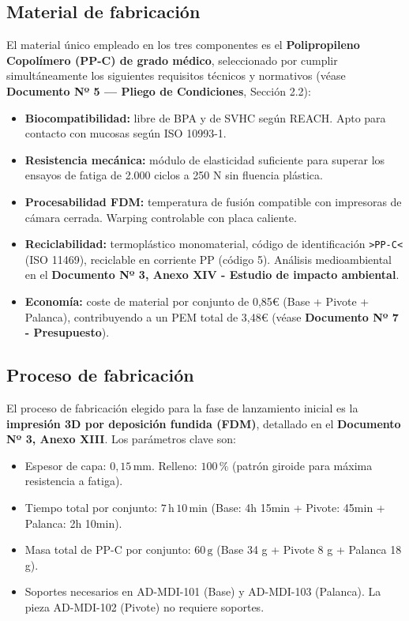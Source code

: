 \documentclass[11pt,a4paper]{article}
\begin{document}
\subsection{Material de fabricación}

El material único empleado en los tres componentes es el \textbf{Polipropileno Copolímero (PP-C) de grado médico}, seleccionado por cumplir simultáneamente los siguientes requisitos técnicos y normativos (véase \textbf{Documento Nº 5 — Pliego de Condiciones}, Sección 2.2):

\begin{itemize}
    \item \textbf{Biocompatibilidad:} libre de BPA y de SVHC según REACH. Apto para contacto con mucosas según ISO 10993-1.
    \item \textbf{Resistencia mecánica:} módulo de elasticidad suficiente para superar los ensayos de fatiga de 2.000 ciclos a 250 N sin fluencia plástica.
    \item \textbf{Procesabilidad FDM:} temperatura de fusión compatible con impresoras de cámara cerrada. Warping controlable con placa caliente.
    \item \textbf{Reciclabilidad:} termoplástico monomaterial, código de identificación \texttt{>PP-C<} (ISO 11469), reciclable en corriente PP (código 5). Análisis medioambiental en el \textbf{Documento Nº 3, Anexo XIV - Estudio de impacto ambiental}.
    \item \textbf{Economía:} coste de material por conjunto de 0,85€ (Base + Pivote + Palanca), contribuyendo a un PEM total de 3,48€ (véase \textbf{Documento Nº 7 - Presupuesto}).
\end{itemize}

\subsection{Proceso de fabricación}

El proceso de fabricación elegido para la fase de lanzamiento inicial es la \textbf{impresión 3D por deposición fundida (FDM)}, detallado en el \textbf{Documento Nº 3, Anexo XIII}. Los parámetros clave son:

\begin{itemize}
    \item Espesor de capa: $0{,}15\,\text{mm}$. Relleno: $100\,\%$ (patrón giroide para máxima resistencia a fatiga).
    \item Tiempo total por conjunto: $7\,\text{h}\,10\,\text{min}$ (Base: 4h 15min + Pivote: 45min + Palanca: 2h 10min).
    \item Masa total de PP-C por conjunto: $60\,\text{g}$ (Base 34 g + Pivote 8 g + Palanca 18 g).
    \item Soportes necesarios en AD-MDI-101 (Base) y AD-MDI-103 (Palanca). La pieza AD-MDI-102 (Pivote) no requiere soportes.
\end{itemize}
\end{document}
